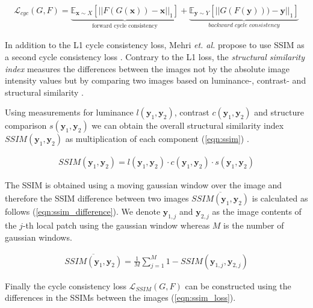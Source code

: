 \documentclass[a4paper,11pt, DIV=12]{scrartcl}
\newcommand{\x}{\boldsymbol{x}}
\newcommand{\y}{\boldsymbol{y}}
\begin{document}
\begin{equation}
   \label{eqn:cyc}
   \begin{aligned}
      \mathcal{L}_{cyc}(G, F) = \underbrace{\mathbb{E}_{\x \sim X}\left[||F(G(\x)) - \x||_1\right]}_{\text{forward cycle consistency}} +
      \underbrace{\mathbb{E}_{\y \sim Y}\left[||G(F(\y))) - \y||_1\right]}_{\textit{backward cycle consistency}}
   \end{aligned}
\end{equation}

In addition to the L1 cycle consistency loss, Mehri \textit{et. al.} propose to use SSIM as a second cycle consistency loss \cite{mehri2019colorizing}.
Contrary to the L1 loss, the \textit{structural similarity index} measures the differences between the images not by the absolute image intensity values but
by comparing two images based on luminance-, contrast- and structural similarity \cite{ssim}.

Using measurements for luminance $l(\y_1, \y_2)$, contrast $c(\y_1,\y_2)$ and structure comparison $s(\y_1, \y_2)$ we can obtain the overall structural similarity
index $SSIM(\y_1, \y_2)$ as multiplication of each component (\autoref{eqn:ssim}) \cite{ssim}.

\begin{equation}
   \label{eqn:ssim}
   \begin{aligned}
      SSIM(\y_1, \y_2) = l(\y_1, \y_2) \cdot c(\y_1,\y_2) \cdot s(\y_1, \y_2)
   \end{aligned}
\end{equation}

The SSIM is obtained using a moving gaussian window over the image and therefore the SSIM difference between two images $\overline{SSIM(\y_1,\y_2)}$ is calculated as follows (\autoref{eqn:ssim_difference}).
We denote $\y_{1,j}$ and $\y_{2,j}$ as the image contents of the $j$-th local patch using the gaussian window whereas $M$ is the number of gaussian windows.

\begin{equation}
   \label{eqn:ssim_difference}
   \begin{aligned}
      \overline{SSIM(\y_1,\y_2)} = \frac{1}{M}\sum_{j=1}^{M}1 - SSIM(\y_{1,j},\y_{2,j})
   \end{aligned}
\end{equation}

Finally the cycle consistency loss $\mathcal{L}_{SSIM}(G,F)$ can be constructed using the differences in the SSIMs between the images (\autoref{eqn:ssim_loss}).
\end{document}
